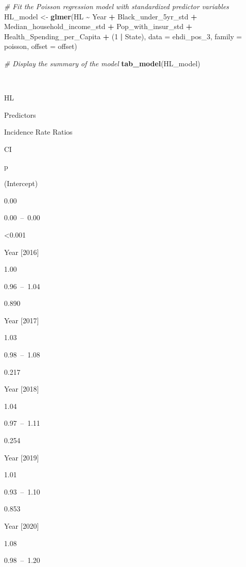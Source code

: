 \documentclass[
]{article}
\newenvironment{Shaded}{\begin{snugshade}}{\end{snugshade}}
\newcommand{\AttributeTok}[1]{\textcolor[rgb]{0.13,0.29,0.53}{#1}}
\newcommand{\CommentTok}[1]{\textcolor[rgb]{0.56,0.35,0.01}{\textit{#1}}}
\newcommand{\DecValTok}[1]{\textcolor[rgb]{0.00,0.00,0.81}{#1}}
\newcommand{\FunctionTok}[1]{\textcolor[rgb]{0.13,0.29,0.53}{\textbf{#1}}}
\newcommand{\NormalTok}[1]{#1}
\newcommand{\OtherTok}[1]{\textcolor[rgb]{0.56,0.35,0.01}{#1}}
\newcommand{\SpecialCharTok}[1]{\textcolor[rgb]{0.81,0.36,0.00}{\textbf{#1}}}
\begin{document}
\begin{Shaded}
\begin{Highlighting}[]
\CommentTok{\# Fit the Poisson regression model with standardized predictor variables}
\NormalTok{HL\_model }\OtherTok{\textless{}{-}} \FunctionTok{glmer}\NormalTok{(HL }\SpecialCharTok{\textasciitilde{}}\NormalTok{ Year }\SpecialCharTok{+}\NormalTok{ Black\_under\_5yr\_std }\SpecialCharTok{+}\NormalTok{ Median\_household\_income\_std }\SpecialCharTok{+} 
\NormalTok{                                 Pop\_with\_insur\_std }\SpecialCharTok{+}\NormalTok{ Health\_Spending\_per\_Capita }\SpecialCharTok{+}\NormalTok{ (}\DecValTok{1} \SpecialCharTok{|}\NormalTok{ State), }
                        \AttributeTok{data =}\NormalTok{ ehdi\_pos\_3, }\AttributeTok{family =}\NormalTok{ poisson, }\AttributeTok{offset =}\NormalTok{ offset)}

\CommentTok{\# Display the summary of the model}
\FunctionTok{tab\_model}\NormalTok{(HL\_model)}
\end{Highlighting}
\end{Shaded}

~

HL

Predictors

Incidence Rate Ratios

CI

p

(Intercept)

0.00

0.00~--~0.00

\textless0.001

Year {[}2016{]}

1.00

0.96~--~1.04

0.890

Year {[}2017{]}

1.03

0.98~--~1.08

0.217

Year {[}2018{]}

1.04

0.97~--~1.11

0.254

Year {[}2019{]}

1.01

0.93~--~1.10

0.853

Year {[}2020{]}

1.08

0.98~--~1.20
\end{document}
